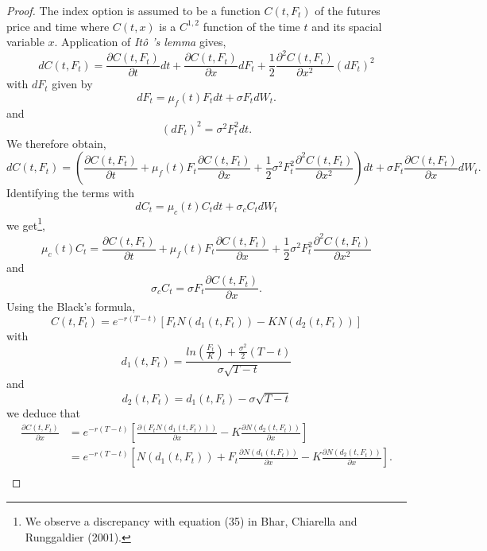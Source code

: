 \documentclass{article}
\theoremstyle{definition}
\theoremstyle{remark}
\newcommand{\Ito}{It\^{o} }
\newcommand{\done}{\ensuremath{\frac{ln\left( \frac{F_t}{K}\right)+\frac{\sigma^2}{2}(T-t)}{\sigma\sqrt{T-t}}}}
\begin{document}
\begin{proof}
The index option is assumed to be a function $C(t,F_t)$ of the futures price and time where $C(t,x)$ is a $C^{1,2}$ function of the time $t$ and its spacial variable $x$. Application of \emph{\Ito's lemma} gives,
\begin{equation*}
dC(t, F_t)=\frac{\partial C(t, F_t)}{\partial t}dt+\frac{\partial C(t, F_t)}{\partial x}dF_t+\frac{1}{2}\frac{\partial^2 C(t, F_t)}{\partial x^2}(dF_t)^2
\end{equation*}
with $dF_t$ given by
\begin{equation*}
dF_t=\mu_f(t) F_tdt + \sigma F_tdW_t. 
\end{equation*}
and
\begin{equation*}
(dF_t)^2=\sigma^2F_t^2dt.
\end{equation*}
We therefore obtain,
\begin{equation*}
dC(t, F_t)=\left( \frac{\partial C(t, F_t)}{\partial t}+\mu_f(t)F_t\frac{\partial C(t, F_t)}{\partial x}+\frac{1}{2}\sigma^2F_t^2\frac{\partial^2 C(t, F_t)}{\partial x^2} \right)dt+\sigma F_t\frac{\partial C(t, F_t)}{\partial x}dW_t.
\end{equation*}
Identifying the terms with 
\begin{equation*}
dC_t = \mu_c(t)C_t dt + \sigma_c C_t dW_t
\end{equation*}
we get\footnote{We observe a discrepancy with equation (35) in Bhar, Chiarella and Runggaldier (2001).},
\begin{equation*}
\mu_c(t) C_t=\frac{\partial C(t, F_t)}{\partial t}+\mu_f(t)F_t\frac{\partial C(t, F_t)}{\partial x}+\frac{1}{2}\sigma^2F_t^2\frac{\partial^2 C(t, F_t)}{\partial x^2}
\end{equation*}
and
\begin{equation*}
\sigma_cC_t=\sigma F_t\frac{\partial C(t, F_t)}{\partial x}.
\end{equation*}
Using the Black's formula,
\begin{equation*}
C(t,F_t)=e^{-r(T-t)}[F_tN(d_1(t,F_t))-KN(d_2(t,F_t))]
\end{equation*}
with
\begin{equation*}
d_1(t, F_t)=\done
\end{equation*}
and
\begin{equation}\label{eq:d2}
d_2(t, F_t)=d_1(t, F_t)-\sigma\sqrt{T-t}
\end{equation}
we deduce that
\begin{align*}
\frac{\partial C(t,F_t)}{\partial x}&=e^{-r(T-t)}\left[ \frac{\partial (F_tN(d_1(t,F_t)))}{\partial x} - K\frac{\partial N(d_2(t,F_t))}{\partial x}\right]\\
&=e^{-r(T-t)}\left[ N(d_1(t, F_t))+F_t\frac{\partial N(d_1(t, F_t))}{\partial x} - K\frac{\partial N(d_2(t, F_t))}{\partial x}\right].\\
\end{align*}


\end{proof}
\end{document}
